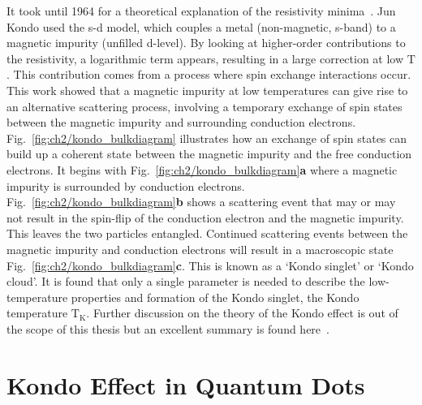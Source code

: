 It took until 1964 for a theoretical explanation of the resistivity minima~\cite{jun_kondo}. Jun Kondo used the s-d model, which couples a metal (non-magnetic, s-band) to a magnetic impurity (unfilled d-level). By looking at higher-order contributions to the resistivity, a logarithmic term appears, resulting in a large correction at low $\mathrm{T}$. This contribution comes from a process where spin exchange interactions occur. This work showed that a magnetic impurity at low temperatures can give rise to an alternative scattering process, involving a temporary exchange of spin states between the magnetic impurity and surrounding conduction electrons. Fig.~\ref{fig:ch2/kondo_bulkdiagram} illustrates how an exchange of spin states can build up a coherent state between the magnetic impurity and the free conduction electrons. It begins with Fig.~\ref{fig:ch2/kondo_bulkdiagram}\textbf{a} where a magnetic impurity is surrounded by conduction electrons. 
Fig.~\ref{fig:ch2/kondo_bulkdiagram}\textbf{b} shows a scattering event that may or may not result in the spin-flip of the conduction electron and the magnetic impurity. This leaves the two particles entangled. Continued scattering events between the magnetic impurity and conduction electrons will result in a macroscopic state Fig.~\ref{fig:ch2/kondo_bulkdiagram}\textbf{c}. This is known as a `Kondo singlet' or `Kondo cloud'. It is found that only a single parameter is needed to describe the low-temperature properties and formation of the Kondo singlet, the Kondo temperature $\mathrm{T_K}$. Further discussion on the theory of the Kondo effect is out of the scope of this thesis but an excellent summary is found here~\cite{kondo_theory_history}. 




\afterpage{\clearpage}
\section{Kondo Effect in Quantum Dots}

